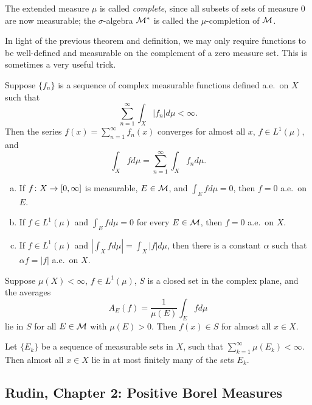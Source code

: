 \begin{definition}
  The extended measure $\mu$ is called \emph{complete}, since all subsets of sets of measure $0$ are now measurable; the $\sigma$-algebra $\mathcal{M}^\ast$ is called the $\mu$-completion of $\mathcal{M}$.
\end{definition}

In light of the previous theorem and definition, we may only require functions to be well-defined and measurable on the complement of a zero measure set. This is sometimes a very useful trick.

\begin{theorem}
  Suppose $\{f_n\}$ is a sequence of complex measurable functions defined a.e.\ on $X$ such that
  \[
  \sum_{n=1}^\infty \int_X |f_n| d\mu < \infty.
  \]
  Then the series $f(x) = \sum_{n=1}^\infty f_n(x)$ converges for almost all $x$, $f \in L^1(\mu)$, and
  \[
  \int_X f d\mu = \sum_{n=1}^\infty \int_X f_n d\mu.
  \]
\end{theorem}

\begin{theorem}
  \mbox{}
  \begin{enumerate}[(a)]
  \item If $f \colon X \rightarrow [0,\infty]$ is measurable, $E \in \mathcal{M}$, and $\int_E f d\mu = 0$, then $f = 0$ a.e.\ on $E$.
  \item If $f \in L^1(\mu)$ and $\int_E f d\mu = 0$ for every $E \in \mathcal{M}$, then $f = 0$ a.e.\ on $X$.
  \item If $f \in L^1(\mu)$ and $\left| \int_X f d\mu \right| = \int_X |f| d\mu$, then there is a constant $\alpha$ such that $\alpha f = |f|$ a.e.\ on $X$.
  \end{enumerate}
\end{theorem}

\begin{theorem}
  Suppose $\mu(X) < \infty$, $f \in L^1(\mu)$, $S$ is a closed set in the complex plane, and the averages
  \[
  A_E(f) = \frac{1}{\mu(E)} \int_E f d\mu
  \]
  lie in $S$ for all $E \in \mathcal{M}$ with $\mu(E) > 0$. Then $f(x) \in S$ for almost all $x \in X$.
\end{theorem}

\begin{theorem}
  Let $\{E_k\}$ be a sequence of measurable sets in $X$, such that $\sum_{k=1}^\infty \mu(E_k) < \infty$. Then almost all $x \in X$ lie in at most finitely many of the sets $E_k$.
\end{theorem}

\subsection{Rudin, Chapter 2: Positive Borel Measures}

